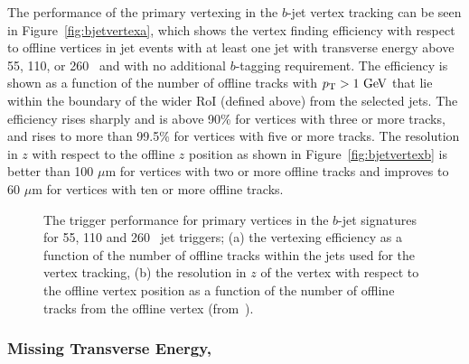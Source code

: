 				The performance of the primary vertexing in the $b$-jet vertex tracking can be seen in Figure~\ref{fig:bjetvertexa}, which shows the vertex finding efficiency with respect to 
				offline vertices in jet events with at least one jet with transverse energy above 55, 110, or 260 \GeV\ and with no additional $b$-tagging requirement. The efficiency is shown 
				as a function of the number of offline tracks with $\pt>1 \GeV$ that lie within the boundary of the wider \ac{RoI} (defined above) from the selected jets. The efficiency rises sharply and 
				is above 90\% for vertices with three or more tracks, and rises to more than 99.5\% for vertices with five or more tracks. The resolution in $z$ with respect to the offline $z$ position as shown in Figure~\ref{fig:bjetvertexb} is better than 100 $\mu$m for vertices with two or more offline tracks and improves to 60 $\mu$m for vertices with ten or more offline tracks.

				\begin{figure}[!htb]
					\centering
					\caption{The trigger performance for primary vertices in the $b$-jet signatures for 55, 110 and 260 \GeV\ jet triggers; (a) the vertexing efficiency as a function of the number of offline tracks within the jets used for the vertex tracking, (b) the resolution in $z$ of the vertex with respect to the offline vertex position as a function of the number of offline tracks from the offline vertex (from~\cite{ATLASTrigger2015}).}
					\label{fig:bjetvertex}
				\end{figure}

			\subsubsection*{Missing Transverse Energy, \met}

